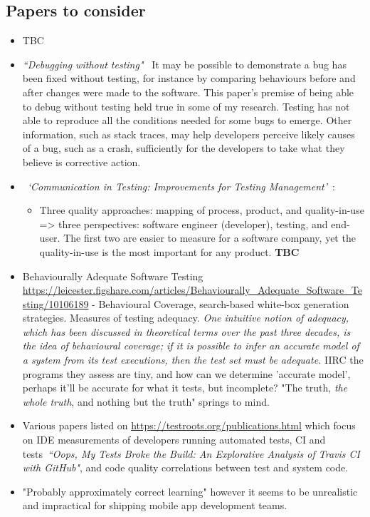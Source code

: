 \subsection{Papers to consider}
\begin{itemize}
    \item TBC
    \item \emph{``Debugging without testing"}~\cite{ghardallou2016debugging_without_testing} It may be possible to demonstrate a bug has been fixed without testing, for instance by comparing behaviours before and after changes were made to the software. This paper's premise of being able to debug without testing held true in some of my research. Testing has not able to reproduce all the conditions needed for some bugs to emerge. Other information, such as stack traces, may help developers perceive likely causes of a bug, such as a crash, sufficiently for the developers to take what they believe is corrective action.  
    
    \item ~\emph{`Communication in Testing: Improvements for Testing Management'}~\citep{paakkonen2009_communication_in_testing}: 
    \begin{itemize}
        \item Three quality approaches: mapping of process, product, and quality-in-use => three perspectives: software engineer (developer), testing, and end-user. The first two are easier to measure for a software company, yet the quality-in-use is the most important for any product. \textbf{TBC}
    \end{itemize}
    
    \item Behaviourally Adequate Software Testing \url{https://leicester.figshare.com/articles/Behaviourally_Adequate_Software_Testing/10106189} - Behavioural Coverage, search-based white-box generation strategies. Measures of testing adequacy. \emph{One intuitive notion of adequacy, which has been discussed in theoretical terms over the past three decades, is the idea of behavioural coverage; if it is possible to infer an accurate model of a system from its test executions, then the test set must be adequate.} IIRC the programs they assess are tiny, and how can we determine 'accurate model', perhaps it'll be accurate for what it tests, but incomplete? "The truth, \emph{the whole truth}, and nothing but the truth" springs to mind. %
    
    \item Various papers listed on \url{https://testroots.org/publications.html} which focus on IDE measurements of developers running automated tests, CI and tests~\emph{``Oops, My Tests Broke the Build: An Explorative Analysis of Travis CI with GitHub"}, and code quality correlations between test and system code.
    
    \item "Probably approximately correct learning" however it seems to be unrealistic and impractical for shipping mobile app development teams.
\end{itemize}


